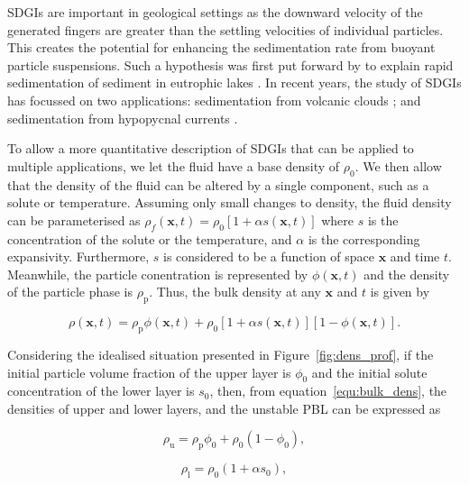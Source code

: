 \documentclass[authoryear,preprint,review,12pt]{elsarticle}
\begin{document}
SDGIs are important in geological settings as the downward velocity of the generated fingers are greater than the settling velocities of individual particles. This creates the potential for enhancing the sedimentation rate from buoyant particle suspensions. Such a hypothesis was first put forward by \citet{Bradley65} to explain rapid sedimentation of sediment in eutrophic lakes \citep{Nipkow20}. In recent years, the study of SDGIs has focussed on two applications: sedimentation from volcanic clouds \citep{Carrazo12, Manzella15, Scollo17}; and sedimentation from hypopycnal currents \citep{Chen97, Parsons01, Snyder11, Rouhnia15, Rouhnia17, Jazi16, Jazi19}.

To allow a more quantitative description of SDGIs that can be applied to multiple applications, we let the fluid have a base density of $\rho_{0}$. We then allow that the density of the fluid can be altered by a single component, such as a solute or temperature. Assuming only small changes to density, the fluid density can be parameterised as $\rho_{f}(\mathbf{x}, t) = \rho_{0} [1 + \alpha s(\mathbf{x}, t)]$ where $s$ is the concentration of the solute or the temperature, and $\alpha$ is the corresponding expansivity. Furthermore, $s$ is considered to be a function of space $\mathbf{x}$ and time $t$. Meanwhile, the particle conentration is represented by $\phi(\mathbf{x}, t)$ and the density of the particle phase is $\rho_{\text{p}}$. Thus, the bulk density at any $\mathbf{x}$ and $t$ is given by

\begin{equation}
  \label{equ:bulk_dens}
  \rho(\mathbf{x}, t) = \rho_{\text{p}} \phi(\mathbf{x}, t) + \rho_{0} [1 + \alpha s(\mathbf{x}, t)] [1 - \phi(\mathbf{x}, t)].
\end{equation}

Considering the idealised situation presented in Figure~\ref{fig:dens_prof}, if the initial particle volume fraction of the upper layer is $\phi_{0}$ and the initial solute concentration of the lower layer is $s_{0}$, then, from equation~\ref{equ:bulk_dens}, the densities of upper and lower layers, and the unstable PBL can be expressed as

\begin{equation}
  \label{equ:up_dens}
  \rho_{\text{u}} = \rho_{\text{p}} \phi_{0} + \rho_{0} (1 - \phi_{0}),
\end{equation}

\begin{equation}
  \label{equ:low_dens}
  \rho_{\text{l}} = \rho_{0} (1 + \alpha s_{0}),
\end{equation}
\end{document}
